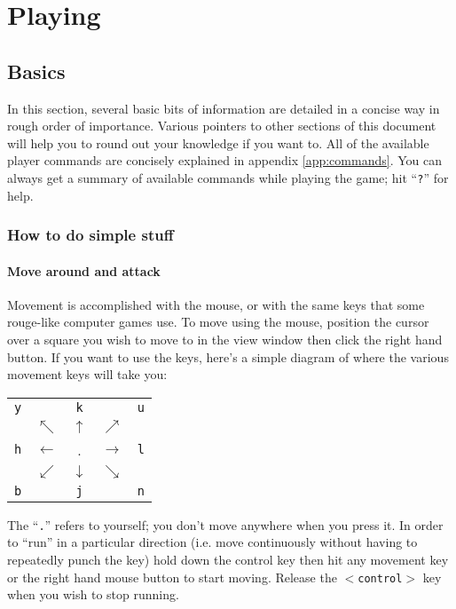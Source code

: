 
\chapter{Playing \cf}

\section{Basics}\label{sec:basic}

In this section, several basic bits of information are detailed in
a concise way in rough order of importance.
Various pointers to other sections of this document will help you to
round out your knowledge if you want to. All of the available player
commands are concisely explained in appendix \ref{app:commands}. You
can always get a summary of available commands while playing the game;
hit ``{\tt ?}'' for help. \\

\subsection{How to do simple stuff} 

\subsubsection{Move around and attack}
Movement is accomplished with the mouse, or
with the same keys that some rouge-like computer games use. To move using
the mouse, position the cursor over a square you wish to move to
in the view window
then click the right hand button. If you want to use the keys, here's a
simple diagram of where the various movement keys will take you: \\
\begin{center}
\begin{tabular}{ccccc}
{\tt y} &  & {\tt k} &  & {\tt u} \\
  & $\nwarrow$  & $\uparrow$  & $\nearrow$ &   \\
{\tt h} & $\longleftarrow$ & .  & $\longrightarrow$ & {\tt l} \\
  & $\swarrow$  & $\downarrow$  & $\searrow$ &   \\
{\tt b} &  & {\tt j} &  & {\tt n} \\
\end{tabular}
\end{center}
The ``{\tt .}'' refers to yourself; you don't move anywhere when you
press it.
In order to ``run'' in a particular direction (i.e. move continuously
without having to repeatedly punch the key) hold down the control
key then hit any movement key or the right hand mouse button to
start moving. Release the {\tt $<$control$>$} key when you wish to stop running.

